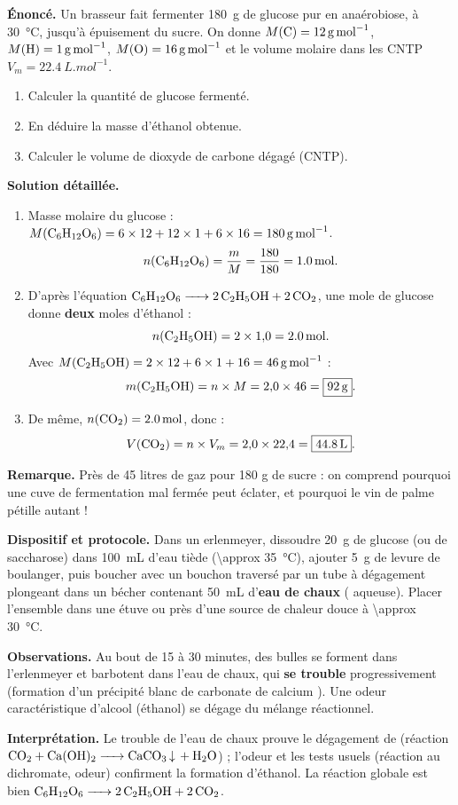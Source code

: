 \documentclass[11pt]{article}
\begin{document}
\begin{exoresolu}
\textbf{Énoncé.} Un brasseur fait fermenter \SI{180}{g} de glucose pur en anaérobiose, à \SI{30}{\celsius}, jusqu'à épuisement du sucre. On donne $M(\ce{C}) = \SI{12}{g.mol^{-1}}$, $M(\ce{H}) = \SI{1}{g.mol^{-1}}$, $M(\ce{O}) = \SI{16}{g.mol^{-1}}$ et le volume molaire dans les CNTP $V_m = \SI{22,4}{L.mol^{-1}}$.
\begin{enumerate}
\item Calculer la quantité de glucose fermenté.
\item En déduire la masse d'éthanol obtenue.
\item Calculer le volume de dioxyde de carbone dégagé (CNTP).
\end{enumerate}
\tcblower
\textbf{Solution détaillée.}
\begin{enumerate}
\item Masse molaire du glucose : $M(\ce{C6H12O6}) = 6 \times 12 + 12 \times 1 + 6 \times 16 = \SI{180}{g.mol^{-1}}$.
\[ n(\ce{C6H12O6}) = \frac{m}{M} = \frac{180}{180} = \SI{1,0}{mol}. \]
\item D'après l'équation $\ce{C6H12O6 -> 2 C2H5OH + 2 CO2}$, une mole de glucose donne \textbf{deux} moles d'éthanol :
\[ n(\ce{C2H5OH}) = 2 \times 1{,}0 = \SI{2,0}{mol}. \]
Avec $M(\ce{C2H5OH}) = 2 \times 12 + 6 \times 1 + 16 = \SI{46}{g.mol^{-1}}$ :
\[ m(\ce{C2H5OH}) = n \times M = 2{,}0 \times 46 = \boxed{\SI{92}{g}}. \]
\item De même, $n(\ce{CO2}) = \SI{2,0}{mol}$, donc :
\[ V(\ce{CO2}) = n \times V_m = 2{,}0 \times 22{,}4 = \boxed{\SI{44,8}{L}}. \]
\end{enumerate}
\textbf{Remarque.} Près de 45 litres de gaz pour 180 g de sucre : on comprend pourquoi une cuve de fermentation mal fermée peut éclater, et pourquoi le vin de palme pétille autant !
\end{exoresolu}

\begin{experience}
\textbf{Dispositif et protocole.} Dans un erlenmeyer, dissoudre \SI{20}{g} de glucose (ou de saccharose) dans \SI{100}{mL} d'eau tiède (\SI{\approx 35}{\celsius}), ajouter \SI{5}{g} de levure de boulanger, puis boucher avec un bouchon traversé par un tube à dégagement plongeant dans un bécher contenant \SI{50}{mL} d'\textbf{eau de chaux} ( aqueuse). Placer l'ensemble dans une étuve ou près d'une source de chaleur douce à \SI{\approx 30}{\celsius}.

\textbf{Observations.} Au bout de 15 à 30 minutes, des bulles se forment dans l'erlenmeyer et barbotent dans l'eau de chaux, qui \textbf{se trouble} progressivement (formation d'un précipité blanc de carbonate de calcium ). Une odeur caractéristique d'alcool (éthanol) se dégage du mélange réactionnel.

\textbf{Interprétation.} Le trouble de l'eau de chaux prouve le dégagement de  (réaction $\ce{CO2 + Ca(OH)2 -> CaCO3 v + H2O}$) ; l'odeur et les tests usuels (réaction au dichromate, odeur) confirment la formation d'éthanol. La réaction globale est bien $\ce{C6H12O6 -> 2 C2H5OH + 2 CO2}$.
\end{experience}
\end{document}
